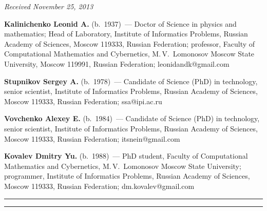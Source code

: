 \hfill{\small\textit{Received November 25, 2013}}

\vspace*{-12pt}

\Contr

\noindent
\textbf{Kalinichenko Leonid A.} (b.\ 1937)~--- Doctor of Science in physics and mathematics; 
Head of Laboratory, Institute of Informatics Problems, Russian Academy of Sciences, Moscow 119333, Russian
Federation; 
professor, Faculty of Computational Mathematics and Cybernetics, M.\,V.~Lomonosov 
Moscow State Univer\-sity, Moscow 119991, Russian Federation; leonidandk@gmail.com 

\vspace*{3pt}

\noindent
\textbf{Stupnikov Sergey A.} (b.\ 1978)~--- Candidate of Science (PhD) in technology, 
senior scientist, Institute of Informatics Problems, Russian Academy of Sciences, 
Moscow 119333, Russian Federation; ssa@ipi.ac.ru

\vspace*{3pt}

\noindent
\textbf{Vovchenko Alexey E.} (b.\ 1984)~--- Candidate of Science (PhD) in technology, 
senior scientist, Institute of Informatics Problems, Russian Academy of Sciences,
Moscow 119333, Russian Federation; itsnein@gmail.com

\vspace*{3pt}

\noindent
\textbf{Kovalev Dmitry Yu.} (b.\ 1988)~--- PhD student, Faculty of Computational 
Mathematics and Cybernetics, M.\,V.~Lomonosov Moscow State University; 
programmer, Institute of Informatics Problems, Russian Academy of Sciences,
Moscow 119333, Russian Federation; dm.kovalev@gmail.com


\vspace*{12pt}

\hrule

\vspace*{2pt}

\hrule


\def\tit{КОНЦЕПТУАЛЬНЫЕ ДЕКЛАРАТИВНЫЕ СПЕЦИФИКАЦИИ И~РЕШЕНИЕ ЗАДАЧ В
ОБЛАСТЯХ С~ИНТЕНСИВНЫМ ИСПОЛЬЗОВАНИЕМ ДАННЫХ}

\def\aut{Л. Калиниченко$^1$, С.~Ступников$^2$, А.~Вовченко$^3$, Д.~Ковалев$^4$}


\def\titkol{Концептуальные декларативные спецификации и решение задач в
областях с интенсивным использованием данных}

